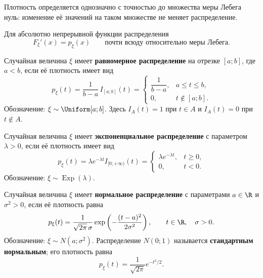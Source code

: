\begin{remark}
    Плотность определяется однозначно с точностью до множества
    меры Лебега нуль: изменение её значений на таком множестве
    не меняет распределение.

    \smallskip
    Для абсолютно непрерывной функции распределения
    \[
        F_\xi'(x)=p_\xi(x)
        \qquad\text{почти всюду относительно меры Лебега}.
    \]
\end{remark}


\begin{definition}
    Случайная величина $\xi$ имеет \textbf{равномерное распределение}
    на отрезке $[a;b]$, где $a<b$, если её плотность имеет вид
    \[
        p_\xi(t)=\frac{1}{b-a}\,I_{[a;b]}(t)
        =\begin{cases}
            \dfrac{1}{b-a},&a\leq t\leq b,\\
            0,&t\notin[a;b].
        \end{cases}
    \]
    Обозначение: $\xi\sim\Uniform[a;b]$.
    Здесь $I_A(t)=1$ при $t\in A$ и $I_A(t)=0$ при $t\notin A$.
\end{definition}

\begin{definition}
    Случайная величина $\xi$ имеет \textbf{экспоненциальное распределение}
    с параметром $\lambda>0$, если её плотность имеет вид
    \[
        p_\xi(t)=\lambda e^{-\lambda t}I_{[0;+\infty)}(t)
        =\begin{cases}
            \lambda e^{-\lambda t},&t\geq0,\\
            0,&t<0.
        \end{cases}
    \]
    Обозначение: $\xi\sim\operatorname{Exp}(\lambda)$.
\end{definition}

\begin{definition}
    Случайная величина $\xi$ имеет \textbf{нормальное распределение}
    с параметрами $a\in\R$ и $\sigma^2>0$, если её плотность равна
    \[
        p_\xi(t)=\frac{1}{\sqrt{2\pi}\,\sigma}
        \exp\left(-\frac{(t-a)^2}{2\sigma^2}\right),
        \qquad t\in\R,\quad\sigma>0.
    \]
    Обозначение: $\xi\sim N(a;\sigma^2)$.
    Распределение $N(0;1)$ называется \textbf{стандартным нормальным};
    его плотность равна
    \[
        p_\xi(t)=\frac{1}{\sqrt{2\pi}}e^{-t^2/2}.
    \]
\end{definition}

